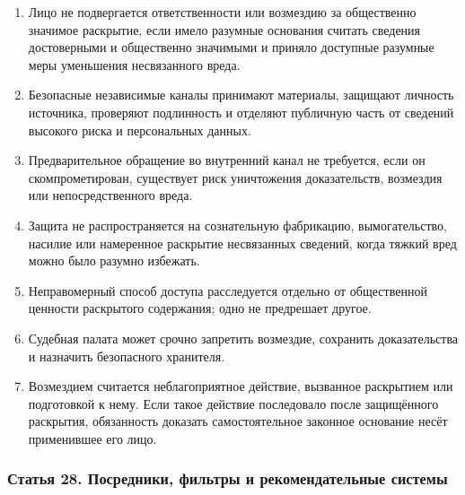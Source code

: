 \documentclass[
  russian,
  11pt,
  a4paper,
]{article}
\providecommand{\tightlist}{%
  \setlength{\itemsep}{0pt}\setlength{\parskip}{0pt}}
\begin{document}
\begin{enumerate}
\def\labelenumi{\arabic{enumi}.}
\tightlist
\item
  Лицо не подвергается ответственности или возмездию за общественно
  значимое раскрытие, если имело разумные основания считать сведения
  достоверными и общественно значимыми и приняло доступные разумные меры
  уменьшения несвязанного вреда.
\item
  Безопасные независимые каналы принимают материалы, защищают личность
  источника, проверяют подлинность и отделяют публичную часть от
  сведений высокого риска и персональных данных.
\item
  Предварительное обращение во внутренний канал не требуется, если он
  скомпрометирован, существует риск уничтожения доказательств, возмездия
  или непосредственного вреда.
\item
  Защита не распространяется на сознательную фабрикацию, вымогательство,
  насилие или намеренное раскрытие несвязанных сведений, когда тяжкий
  вред можно было разумно избежать.
\item
  Неправомерный способ доступа расследуется отдельно от общественной
  ценности раскрытого содержания; одно не предрешает другое.
\item
  Судебная палата может срочно запретить возмездие, сохранить
  доказательства и назначить безопасного хранителя.
\item
  Возмездием считается неблагоприятное действие, вызванное раскрытием
  или подготовкой к нему. Если такое действие последовало после
  защищённого раскрытия, обязанность доказать самостоятельное законное
  основание несёт применившее его лицо.
\end{enumerate}

\subsubsection{Статья 28. Посредники, фильтры и рекомендательные
системы}\label{ux441ux442ux430ux442ux44cux44f-28-ux43fux43eux441ux440ux435ux434ux43dux438ux43aux438-ux444ux438ux43bux44cux442ux440ux44b-ux438-ux440ux435ux43aux43eux43cux435ux43dux434ux430ux442ux435ux43bux44cux43dux44bux435-ux441ux438ux441ux442ux435ux43cux44b}
\end{document}
